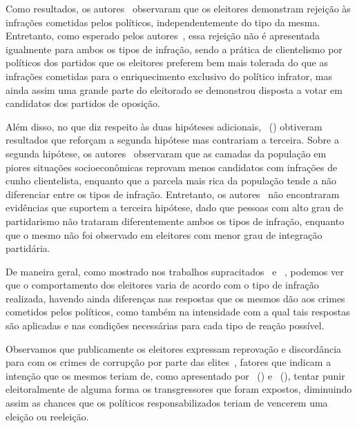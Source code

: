 \documentclass[
	12pt,				%
	openright,			%
	twoside,			%
	a4paper,			%
	openany,
	english,			%
	brazil				%
	]{abntex2}
\begin{document}
Como resultados, os autores~\cite{Botero2021Apr} observaram que os eleitores demonstram rejeição às infrações cometidas pelos políticos, independentemente do tipo da mesma. Entretanto, como esperado pelos autores~\cite{Botero2021Apr}, essa rejeição não é apresentada igualmente para ambos os tipos de infração, sendo a prática de clientelismo por políticos dos partidos que os eleitores preferem bem mais tolerada do que as infrações cometidas para o enriquecimento exclusivo do político infrator, mas ainda assim uma grande parte do eleitorado se demonstrou disposta a votar em candidatos dos partidos de oposição.

Além disso, no que diz respeito às duas hipóteses adicionais, ~(\citeyear{Botero2021Apr}) obtiveram resultados que reforçam a segunda hipótese mas contrariam a terceira. Sobre a segunda hipótese, os autores~\cite{Botero2021Apr} observaram que as camadas da população em piores situações socioeconômicas reprovam menos candidatos com infrações de cunho clientelista, enquanto que a parcela mais rica da população tende a não diferenciar entre os tipos de infração. Entretanto, os autores~\cite{Botero2021Apr} não encontraram evidências que suportem a terceira hipótese, dado que pessoas com alto grau de partidarismo não trataram diferentemente ambos os tipos de infração, enquanto que o mesmo não foi observado em eleitores com menor grau de integração partidária. %




De maneira geral, como mostrado nos trabalhos supracitados~\cite{Boas2019Apr} e ~\cite{Botero2021Apr}, podemos ver que o comportamento dos eleitores varia de acordo com o tipo de infração realizada, havendo ainda diferenças nas respostas que os mesmos dão aos crimes cometidos pelos políticos, como também na intensidade com a qual tais respostas são aplicadas e nas condições necessárias para cada tipo de reação possível.

Observamos que publicamente os eleitores expressam reprovação e discordância para com os crimes de corrupção por parte das elites~\cite{Boas2019Apr}, fatores que indicam a intenção que os mesmos teriam de, como apresentado por ~(\citeyear{ferraz2008exposing}) e ~(\citeyear{Avis2018Oct}), tentar punir eleitoralmente de alguma forma os transgressores que foram expostos, diminuindo assim as chances que os políticos responsabilizados teriam de vencerem uma eleição ou reeleição.
\end{document}
